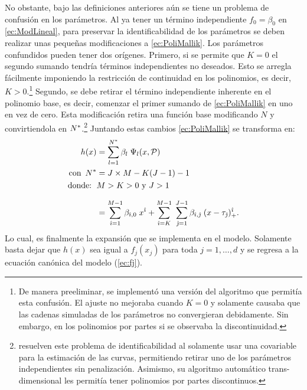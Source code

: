 \documentclass[../Main/Main.tex]{subfiles}
\begin{document}
No obstante, bajo las definiciones anteriores aún se tiene un problema de confusión en los parámetros. Al ya tener un término independiente $f_0 = \beta_0$ en \eqref{ec:ModLineal}, para preservar la identificabilidad de los parámetros se deben realizar unas pequeñas modificaciones a \eqref{ec:PoliMallik}. Los parámetros confundidos pueden tener dos orígenes. Primero, si se permite que $K = 0$ el segundo sumando tendría términos independientes no deseados. Esto se arregla fácilmente imponiendo la restricción de continuidad en los polinomios, es decir, $K > 0$.\footnote{De manera preeliminar, se implementó una versión del algoritmo que permitía esta confusión. El ajuste no mejoraba cuando $K = 0$ y solamente causaba que las cadenas simuladas de los parámetros no convergieran debidamente. Sin embargo, en los polinomios por partes si se observaba la discontinuidad.} Segundo, se debe retirar el término independiente inherente en el polinomio base, es decir, comenzar el primer sumando de \eqref{ec:PoliMallik} en uno en vez de cero. Esta modificación retira una función base modificando $N$ y convirtiendola en $N^*$.\footnote{\citeauthor{mallik1998automatic} resuelven este problema de identificabilidad al solamente usar una covariable para la estimación de las curvas, permitiendo retirar uno de los parámetros independientes sin penalización. Asimismo, su algoritmo automático trans-dimensional les permitía tener polinomios por partes discontinuos.} Juntando estas cambios \eqref{ec:PoliMallik} se transforma en:
\begin{align}
	h(x) &= \sum_{l = 1}^{N^*} \beta_l \; \Psi_l(x,\mathcal{P}) \nonumber\\ 
	\text{con } \, N^* &= J\times M - K(J-1) - 1\nonumber \\
	\text{donde: } \, & M > K > 0 \text{ y } J > 1 \nonumber \\[7pt]
 		 &=	\sum_{\hat{\imath} = 1}^{M - 1} \beta_{\hat{\imath},0} \; x^{\hat{\imath}} + 
		\sum_{\hat{\imath} = K}^{M-1} \;
	 		\sum_{\hat{\jmath} = 1}^{J-1}\beta_{\hat{\imath},\hat{\jmath}}\;(x - \tau_{\hat{\jmath}})_+^{\hat{\imath}}.
	 			\label{ec:PoliFinal}
\end{align}
Lo cual, es finalmente la expansión que se implementa en el modelo. Solamente basta dejar que $h(x)$ sea igual a $f_j(x_j)$ para toda $j = 1,\ldots,d$ y se regresa a la ecuación canónica del modelo (\ref{ec:fj}).
\end{document}
